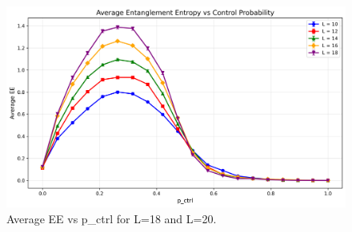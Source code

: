 \documentclass[11pt,a4paper]{article}
\begin{document}
\begin{figure}[H]
    \centering
    \includegraphics[width=0.8\linewidth]{average_EE_vs_p_ctrl.png}
    \caption{Average EE vs p\_ctrl for L=18 and L=20.}
    \label{fig:average_EE_vs_p_ctrl}
\end{figure}



\end{document}
